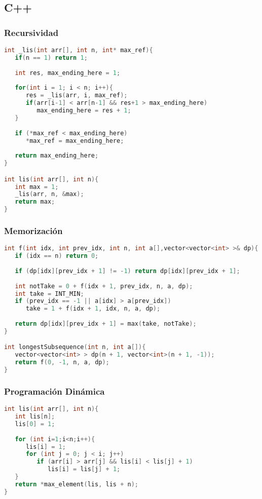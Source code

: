 \subsection{C++}

\subsubsection{Recursividad}
\begin{lstlisting}[language=C++]
int _lis(int arr[], int n, int* max_ref){
   if(n == 1) return 1;
   
   int res, max_ending_here = 1;
   
   for(int i = 1; i < n; i++){
      res = _lis(arr, i, max_ref);
      if(arr[i-1] < arr[n-1] && res+1 > max_ending_here)
         max_ending_here = res + 1;
   }
	
   if (*max_ref < max_ending_here)
      *max_ref = max_ending_here;
	
   return max_ending_here;
}

int lis(int arr[], int n){
   int max = 1;
   _lis(arr, n, &max);
   return max;
}
\end{lstlisting}


\subsubsection{Memorización}
\begin{lstlisting}[language=C++]
int f(int idx, int prev_idx, int n, int a[],vector<vector<int> >& dp){
   if (idx == n) return 0;
   
   if (dp[idx][prev_idx + 1] != -1) return dp[idx][prev_idx + 1];
	
   int notTake = 0 + f(idx + 1, prev_idx, n, a, dp);
   int take = INT_MIN;
   if (prev_idx == -1 || a[idx] > a[prev_idx]) 
      take = 1 + f(idx + 1, idx, n, a, dp);
   
   return dp[idx][prev_idx + 1] = max(take, notTake);
}

int longestSubsequence(int n, int a[]){
   vector<vector<int> > dp(n + 1, vector<int>(n + 1, -1));
   return f(0, -1, n, a, dp);
}
\end{lstlisting}

\subsubsection{Programación Dinámica}
\begin{lstlisting}[language=C++]
int lis(int arr[], int n){
   int lis[n];
   lis[0] = 1;
	
   for (int i=1;i<n;i++){
      lis[i] = 1;
      for (int j = 0; j < i; j++)
         if (arr[i] > arr[j] && lis[i] < lis[j] + 1)
            lis[i] = lis[j] + 1;
   }
   return *max_element(lis, lis + n);
}

\end{lstlisting}

